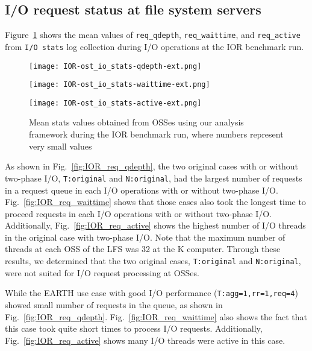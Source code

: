 \documentclass{jhps}
\begin{document}
\subsection{I/O request status at file system servers}

Figure~\ref{fig:IOR_OST_IO_STATS} shows the mean values of
{\tt req\_qdepth}, {\tt req\_waittime}, and {\tt req\_active}
from {\tt I/O stats} log collection during I/O operations
at the IOR benchmark run.
%
\begin{figure}[tb]
\centering
\begin{minipage}[t]{0.46\textwidth}
 \centering
 \texttt{[image: IOR-ost\_io\_stats-qdepth-ext.png]}
 \label{fig:IOR_req_qdepth}
\end{minipage}
%
\begin{minipage}[t]{0.46\textwidth}
 \centering
 \texttt{[image: IOR-ost\_io\_stats-waittime-ext.png]}
 \label{fig:IOR_req_waittime}
\end{minipage}
%
\noindent
\begin{minipage}[t]{0.44\textwidth}
 \centering
 \texttt{[image: IOR-ost\_io\_stats-active-ext.png]}
 \label{fig:IOR_req_active}
\end{minipage}
%
\caption{Mean stats values obtained from OSSes using our analysis framework
during the IOR benchmark run, where numbers represent very small values}
\label{fig:IOR_OST_IO_STATS}
\end{figure}
%
As shown in Fig.~\ref{fig:IOR_req_qdepth}, the two original cases
with or without two-phase I/O, {\tt T:original} and {\tt N:original},
had the largest number of requests in a request queue
in each I/O operations with or without two-phase I/O.
Fig.~\ref{fig:IOR_req_waittime} shows that those cases also took
the longest time to proceed requests
in each I/O operations with or without two-phase I/O.
Additionally, Fig.~\ref{fig:IOR_req_active} shows
the highest number of I/O threads in the original case
with two-phase I/O.
Note that the maximum number of threads at each OSS of the LFS was 32
at the K computer.
Through these results, we determined that the two original cases,
{\tt T:original} and {\tt N:original}, were not suited for
I/O request processing at OSSes.

While the EARTH use case with good I/O performance ({\tt T:agg=1,rr=1,req=4})
showed small number of requests in the queue,
as shown in Fig.~\ref{fig:IOR_req_qdepth}.
Fig.~\ref{fig:IOR_req_waittime} also shows
the fact that this case took quite short times to process I/O requests.
Additionally, Fig.~\ref{fig:IOR_req_active} shows
many I/O threads were active in this case.
\end{document}
